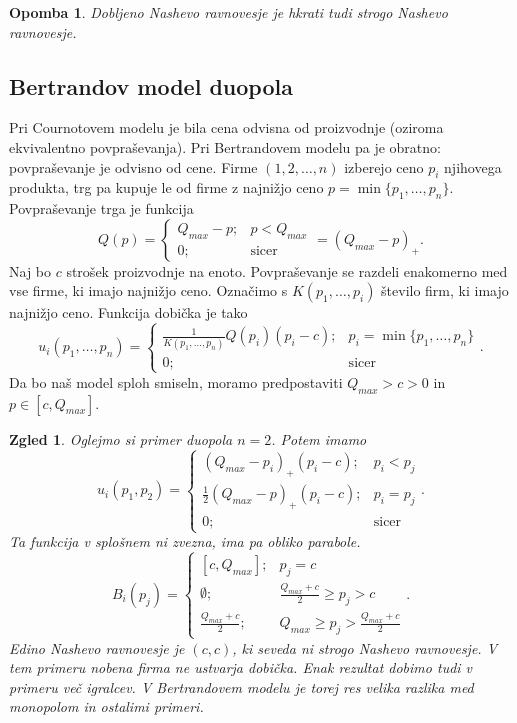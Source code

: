 \documentclass[10pt, a4paper]{article}
\newtheorem*{opomba}{Opomba}
\newtheorem{zgled}[izr]{Zgled}
\begin{document}
\begin{opomba}
  Dobljeno Nashevo ravnovesje je hkrati tudi strogo Nashevo ravnovesje.
\end{opomba}

\subsection{Bertrandov model duopola}

Pri Cournotovem modelu je bila cena odvisna od proizvodnje (oziroma ekvivalentno povpraševanja).
Pri Bertrandovem modelu pa je obratno: povpraševanje je odvisno od cene.
Firme $(1, 2, \dots, n)$ izberejo ceno $p_i$ njihovega produkta, trg pa kupuje le od firme z najnižjo ceno $p = \min \{p_1, \dots, p_n\}$.
Povpraševanje trga je funkcija 
$$Q(p) = \begin{cases}
  Q_{max} - p; & p < Q_{max}\\
  0; & \textrm{sicer}
\end{cases} = (Q_{max} - p)_+.$$
Naj bo $c$ strošek proizvodnje na enoto. Povpraševanje se razdeli enakomerno med vse firme, ki imajo najnižjo ceno.
Označimo s $K(p_1, \dots, p_i)$ število firm, ki imajo najnižjo ceno.
Funkcija dobička je tako 
$$
  u_i (p_1, \dots, p_n) = \begin{cases}
    \frac{1}{K(p_1, \dots, p_n)} Q(p_i) (p_i - c); & p_i = \min \{p_1, \dots, p_n\}\\
    0; & \textrm{sicer}
  \end{cases}. 
$$
Da bo naš model sploh smiseln, moramo predpostaviti $Q_{max} > c > 0$ in $p \in [c, Q_{max}]$.
\begin{zgled}
  Oglejmo si primer duopola $n = 2$. Potem imamo 
  $$u_i (p_1, p_2) = \begin{cases}
    (Q_{max} - p_i)_+ (p_i - c); & p_i < p_j\\
    \frac{1}{2} (Q_{max} - p)_+ (p_i - c); & p_i = p_j\\
    0; & \textrm{sicer}
  \end{cases}.$$
  Ta funkcija v splošnem ni zvezna, ima pa obliko parabole.
  $$B_i(p_j) = \begin{cases}
    [c, Q_{max}]; & {p_j = c}\\
    \emptyset; & \frac{Q_{max} + c}{2} \geq p_j > c\\
    \frac{Q_{max} + c}{2}; & Q_{max} \geq p_j > \frac{Q_{max} + c}{2}
  \end{cases}.$$
  Edino Nashevo ravnovesje je $(c, c)$, ki seveda ni strogo Nashevo ravnovesje. V tem primeru nobena firma 
  ne ustvarja dobička. Enak rezultat dobimo tudi v primeru več igralcev. V Bertrandovem modelu je torej res velika razlika med monopolom in 
  ostalimi primeri.
\end{zgled}
\end{document}
